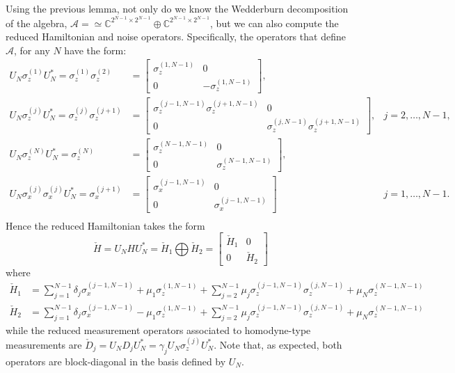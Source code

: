 \documentclass[aihp,12pt]{imsart}
\newcommand{\As}{\mathscr{A}}
\newcommand{\Cb}{\mathbb{C}}
\theoremstyle{theorem}
\theoremstyle{definition}
\theoremstyle{remark}
\begin{document}
Using the previous lemma, not only do we know the Wedderburn decomposition of the algebra, $\As = \simeq \Cb^{2^{N-1} \times 2^{N-1}} \oplus \Cb^{2^{N-1} \times 2^{N-1}}$, but we can also compute the reduced Hamiltonian and noise operators. 
Specifically, the operators that define $\As$, for any $N$ have the form:
\begin{align*}
    U_N \sigma_z^{(1)} U_N^* = \sigma_z^{(1)}\sigma_z^{(2)} &= \left[\begin{array}{c|c}
         \sigma_z^{(1,N-1)}&0  \\\hline
         0&-\sigma_z^{(1,N-1)} 
    \end{array}\right],\\
    U_N \sigma_z^{(j)} U_N^* = \sigma_z^{(j)}\sigma_z^{(j+1)} &= \left[\begin{array}{c|c}
         \sigma_z^{(j-1,N-1)}\sigma_z^{(j+1,N-1)}&0  \\\hline
         0&\sigma_z^{(j,N-1)}\sigma_z^{(j+1,N-1)} 
    \end{array}\right], & j=2,\dots,N-1,\\
    U_N \sigma_z^{(N)} U_N^* = \sigma_z^{(N)} &= \left[\begin{array}{c|c}
         \sigma_z^{(N-1,N-1)}&0  \\\hline
         0&\sigma_z^{(N-1,N-1)} 
    \end{array}\right],\\
    U_N \sigma_x^{(j)}\sigma_x^{(j)} U_N^* = \sigma_x^{(j+1)} &= \left[\begin{array}{c|c}
         \sigma_x^{(j-1,N-1)}&0  \\\hline
         0&\sigma_x^{(j-1,N-1)} 
    \end{array}\right] & j=1,\dots,N-1.\\
\end{align*}
Hence the reduced Hamiltonian takes the form
\[\check{H} = U_N H U_N^* = \check{H}_1\bigoplus \check{H}_2 = \left[\begin{array}{c|c}
         \check{H}_1&0  \\\hline
         0&\check{H}_2
    \end{array}\right] \]
where 
\begin{align*}
    \check{H}_1 &= \sum_{j=1}^{N-1}\delta_j\sigma_x^{(j-1,N-1)} + \mu_1 \sigma_z^{(1,N-1)} + \sum_{j=2}^{N-1} \mu_j \sigma_z^{(j-1,N-1)}\sigma_z^{(j,N-1)} + \mu_N \sigma_z^{(N-1,N-1)}\\
    \check{H}_2 &= \sum_{j=1}^{N-1}\delta_j\sigma_x^{(j-1,N-1)} -\mu_1 \sigma_z^{(1,N-1)} + \sum_{j=2}^{N-1} \mu_j \sigma_z^{(j-1,N-1)}\sigma_z^{(j,N-1)} + \mu_N \sigma_z^{(N-1,N-1)}
\end{align*}
while the reduced measurement operators associated to homodyne-type measurements are $\check{D}_j = U_N D_j U_N^* = \gamma_j U_N \sigma_z^{(j)} U_N^*$. Note that, as expected, both operators are block-diagonal in the basis defined by $U_N$.
\end{document}
